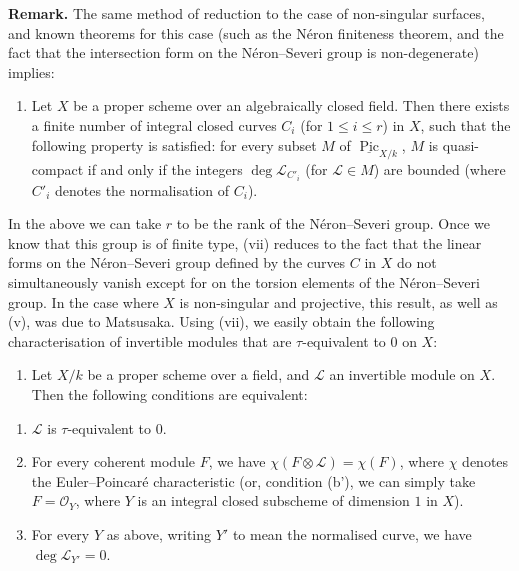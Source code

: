 \documentclass{article}
\providecommand{\tightlist}{%
  \setlength{\itemsep}{0pt}\setlength{\parskip}{0pt}}
\newenvironment{rmenv}[1]
  {\phantomsection\par\smallskip\noindent\textbf{#1.}\rmfamily}
  {\par\smallskip}
\theoremstyle{definition}
\theoremstyle{definition}
\theoremstyle{definition}
\theoremstyle{definition}
\theoremstyle{remark}
\begin{document}
\begin{rmenv}{Remark}
The same method of reduction to the case of non-singular surfaces, and known theorems for this case (such as the Néron finiteness theorem, and the fact that the intersection form on the Néron--Severi group is non-degenerate) implies:

\begin{enumerate}
\def\labelenumi{\roman{enumi}.}
\setcounter{enumi}{6}
\tightlist
\item
  Let \(X\) be a proper scheme over an algebraically closed field.
  Then there exists a finite number of integral closed curves \(C_i\) (for \(1\leqslant i\leqslant r\)) in \(X\), such that the following property is satisfied:
  for every subset \(M\) of \(\underline{\operatorname{Pic}}_{X/k}\), \(M\) is quasi-compact if and only if the integers \(\deg{\mathscr{L}}_{C'_i}\) (for \({\mathscr{L}}\in M\)) are bounded (where \(C'_i\) denotes the normalisation of \(C_i\)).
\end{enumerate}

In the above we can take \(r\) to be the rank of the Néron--Severi group.
Once we know that this group is of finite type, (vii) reduces to the fact that the linear forms on the Néron--Severi group defined by the curves \(C\) in \(X\) do not simultaneously vanish except for on the torsion elements of the Néron--Severi group.
In the case where \(X\) is non-singular and projective, this result, as well as (v), was due to Matsusaka.
Using (vii), we easily obtain the following characterisation of invertible modules that are \(\tau\)-equivalent to \(0\) on \(X\):

\begin{enumerate}
\def\labelenumi{\roman{enumi}.}
\setcounter{enumi}{7}
\tightlist
\item
  Let \(X/k\) be a proper scheme over a field, and \({\mathscr{L}}\) an invertible module on \(X\).
  Then the following conditions are equivalent:
\end{enumerate}

\begin{enumerate}
\def\labelenumi{\alph{enumi}.}
\tightlist
\item
  \({\mathscr{L}}\) is \(\tau\)-equivalent to \(0\).
\item
  For every coherent module \(F\), we have \(\chi(F\otimes{\mathscr{L}})=\chi(F)\), where \(\chi\) denotes the Euler--Poincaré characteristic (or, condition (b'), we can simply take \(F={\mathscr{O}}_Y\), where \(Y\) is an integral closed subscheme of dimension \(1\) in \(X\)).
\item
  For every \(Y\) as above, writing \(Y'\) to mean the normalised curve, we have \(\deg{\mathscr{L}}_{Y'}=0\).
\end{enumerate}


\end{rmenv}
\end{document}
